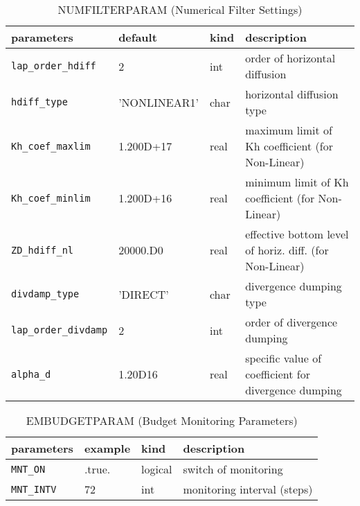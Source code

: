 \documentclass[a4paper]{article}
\begin{document}
\begin{table}[htb]
\begin{center}
\caption{NUMFILTERPARAM (Numerical Filter Settings)}
\begin{tabularx}{150mm}{|l|l|l|X|} \hline
 \rowcolor[gray]{0.9} parameters & default & kind & description          \\ \hline
 \verb|lap_order_hdiff| & 2            & int  & order of horizontal diffusion \\ \hline
 \verb|hdiff_type|      & 'NONLINEAR1' & char & horizontal diffusion type \\ \hline
 \verb|Kh_coef_maxlim|  & 1.200D+17    & real & maximum limit of Kh coefficient (for Non-Linear) \\ \hline
 \verb|Kh_coef_minlim|  & 1.200D+16    & real & minimum limit of Kh coefficient (for Non-Linear) \\ \hline
 \verb|ZD_hdiff_nl|     & 20000.D0     & real & effective bottom level of horiz. diff. (for Non-Linear) \\ \hline
 \verb|divdamp_type|    &  'DIRECT'    & char & divergence dumping type \\ \hline
 \verb|lap_order_divdamp| & 2          & int  & order of divergence dumping \\ \hline
 \verb|alpha_d|         & 1.20D16      & real & specific value of coefficient for divergence dumping \\ \hline
\end{tabularx}
\end{center}
\end{table}

\begin{table}[htb]
\begin{center}
\caption{EMBUDGETPARAM (Budget Monitoring Parameters)}
\begin{tabularx}{150mm}{|l|l|l|X|} \hline
 \rowcolor[gray]{0.9} parameters & example & kind & description          \\ \hline
 \verb|MNT_ON|   & .true. & logical & switch of monitoring \\ \hline
 \verb|MNT_INTV| & 72     & int     & monitoring interval (steps) \\ \hline
\end{tabularx}
\end{center}
\end{table}
\end{document}
